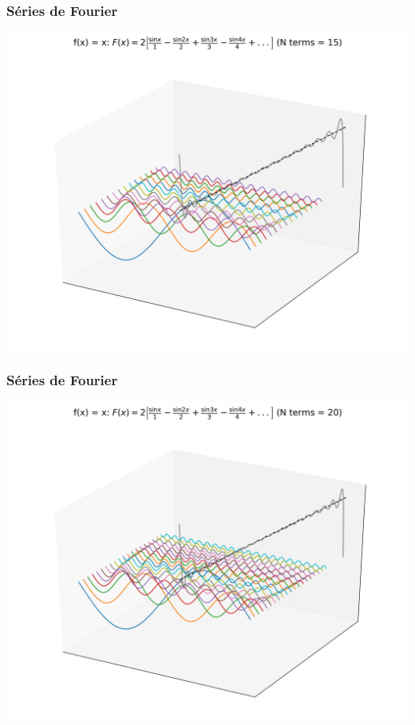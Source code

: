 \documentclass{beamer}
\begin{document}
\begin{frame}
\frametitle{Séries de Fourier}
\begin{center}
\includegraphics[scale=0.4]{Figuras/x15.jpg}
\end{center}
\end{frame}
\begin{frame}
\frametitle{Séries de Fourier}
\begin{center}
\includegraphics[scale=0.4]{Figuras/x20.jpg}
\end{center}
\end{frame}
\end{document}

